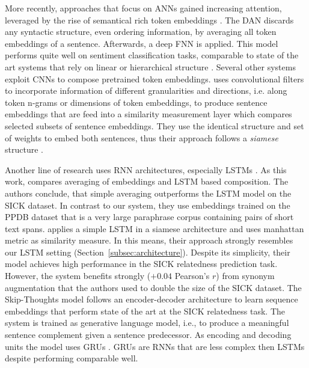 More recently, approaches that focus on \aclp{ANN} gained increasing attention, leveraged by the rise of semantical rich token embeddings \autocite{mikolov_distributed_2013, pennington_glove_2014, wieting_paraphrase_2015}. The \acf{DAN} \autocite{iyyer_deep_2015} discards any syntactic structure, even ordering information, by averaging all token embeddings of a sentence. Afterwards, a deep \ac{FNN} is applied. This model performs quite well on sentiment classification tasks, comparable to state of the art systems that rely on linear \autocite{kim_convolutional_2014} or hierarchical structure \autocite{tai_improved_2015}. Several other systems \autocite{kim_convolutional_2014,kalchbrenner_convolutional_2014,hu_convolutional_2014,yin_convolutional_2015,he_multi-perspective_2015} exploit \acfp{CNN} \autocite{lecun_convolutional_1995} to compose pretrained token embeddings. \textcite{he_multi-perspective_2015} uses convolutional filters to incorporate information of different granularities and directions, i.e. along token n-grams or dimensions of token embeddings, to produce sentence embeddings that are feed into a similarity measurement layer which compares selected subsets of sentence embeddings. They use the identical structure and set of weights to embed both sentences, thus their approach follows a \textit{siamese} structure \autocite{bromley_signature_1994}. %

Another line of research uses \ac{RNN} architectures, especially \acfp{LSTM} \autocite{wieting_towards_2015,liu_multi-timescale_2015,mueller_siamese_2016}. As this work, \textcite{wieting_towards_2015} compares averaging of embeddings and \ac{LSTM} based composition. The authors conclude, that simple averaging outperforms the \ac{LSTM} model on the SICK dataset. In contrast to our system, they use embeddings trained on the PPDB \autocite{ganitkevitch_ppdb_2013} dataset that is a very large paraphrase corpus containing pairs of short text spans. \textcite{mueller_siamese_2016} applies a simple \ac{LSTM} in a siamese architecture and uses manhattan metric as similarity measure. In this means, their approach strongly resembles our \ac{LSTM} setting (Section~\ref{subsec:architecture}). Despite its simplicity, their model achieves high performance in the SICK relatedness prediction task. However, the system benefits strongly ($+0.04$ Pearson's $r$) from synonym augmentation that the authors used to double the size of the SICK dataset.
The Skip-Thoughts \autocite{kiros_skip-thought_2015} model follows an encoder-decoder architecture to learn sequence embeddings that perform state of the art at the SICK relatedness task. The system is trained as generative language model, i.e., to produce a meaningful sentence complement given a sentence predecessor. As encoding and decoding units the model uses \acfp{GRU} \autocite{cho_learning_2014}. \acp{GRU} are \acp{RNN} that are less complex then \acp{LSTM} despite performing comparable well. 

